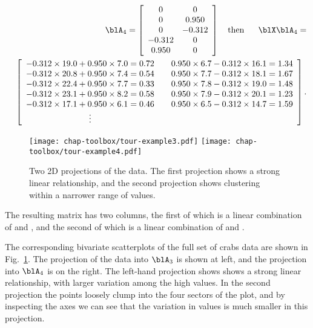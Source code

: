 \begin{eqnarray*}
& & \blA_4 = \left[ \begin{array}{cc} 0 & 0\\ 0 & 0.950\\ 0 & -0.312\\ 
  -0.312 & 0\\ 0.950 & 0 
\end{array} \right] 
~~~ \mbox{then }~~~~ \blX\blA_4 = \\
& &\left[
\begin{array}{cc} -0.312\times 19.0+0.950\times 7.0 = 0.72 & 
  ~~~0.950\times 6.7-0.312\times 16.1 = 1.34 \\ 
-0.312\times 20.8+0.950\times 7.4 = 0.54  & 
  ~~~0.950\times 7.7-0.312\times 18.1 = 1.67 \\ 
-0.312\times 22.4+0.950\times 7.7 = 0.33 & 
  ~~~0.950\times 7.8-0.312\times 19.0 = 1.48 \\
-0.312\times 23.1+0.950\times 8.2 = 0.58 & 
  ~~~0.950\times 7.9-0.312\times 20.1 = 1.23 \\ 
-0.312\times 17.1+0.950\times 6.1 = 0.46 & 
  ~~~0.950\times 6.5-0.312\times 14.7 = 1.59 \\ 
 \vdots \end{array} \right].
\end{eqnarray*}

\begin{figure}[htbp]
\centerline{
 {\texttt{[image: chap-toolbox/tour-example3.pdf]}}
 {\texttt{[image: chap-toolbox/tour-example4.pdf]}}}
\caption[Two-dimensional projections of the  data]{Two 2D
projections of the  data.  The first projection shows a
strong linear relationship, and the second projection shows clustering
within a narrower range of values.}
\label{tour2D-examples}
\end{figure}

\noindent The resulting matrix has two columns, the first of which is
a linear combination of  and , and
the second of which is a linear combination of  and
.

The corresponding bivariate scatterplots of the full set of crabs data
are shown in Fig.~\ref{tour2D-examples}. The projection of the data
into $\blA_3$ is shown at left, and the projection into $\blA_4$ is on
the right. The left-hand projection shows shows a strong linear
relationship, with larger variation among the high values. In the
second projection the points loosely clump into the four sectors of
the plot, and by inspecting the axes we can see that the variation in
values is much smaller in this projection.

